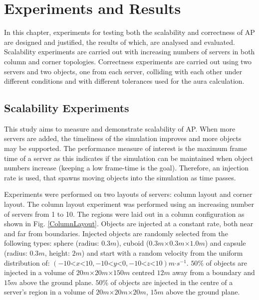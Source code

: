 \chapter{Experiments and Results}
In this chapter, experiments for testing both the scalability and correctness of AP are designed and justified, the results of which, are analysed and evaluated. Scalability experiments are carried out with increasing numbers of servers in both column and corner topologies. Correctness experiments are carried out using two servers and two objects, one from each server, colliding with each other under different conditions and with different tolerances used for the aura calculation.

\section{Scalability Experiments}
This study aims to measure and demonstrate scalability of AP. When more servers are added, the timeliness of the simulation improves and more objects may be supported. The performance measure of interest is the maximum frame time of a server as this indicates if the simulation can be maintained when object numbers increase (keeping a low frame-time is the goal). Therefore, an injection rate is used, that spawns moving objects into the simulation as time passes.

Experiments were performed on two layouts of servers: column layout and corner layout. The column layout experiment was performed using an increasing number of servers from 1 to 10. The regions were laid out in a column configuration as shown in Fig. \ref{ColumnLayout}. Objects are injected at a constant rate, both near and far from boundaries. Injected objects are randomly selected from the following types: sphere (radius: $0.3m$), cuboid ($0.3m\mathord{\times}0.3m\mathord{\times}1.0m$) and capsule (radius: $0.3m$, height: $2m$) and start with a random velocity from the uniform distribution of: $(-10\mathord{<}x\mathord{<}10,-10\mathord{<}y\mathord{<}0,-10\mathord{<}z\mathord{<}10)m\mathord{\cdot}s^{-1}$. $50\%$ of objects are injected in a volume of $20m\mathord{\times}20m\mathord{\times}150m$ centred $12m$ away from a boundary and $15m$ above the ground plane. $50\%$ of objects are injected in the centre of a server's region in a volume of $20m\mathord{\times}20m\mathord{\times}20m$, $15m$ above the ground plane.

